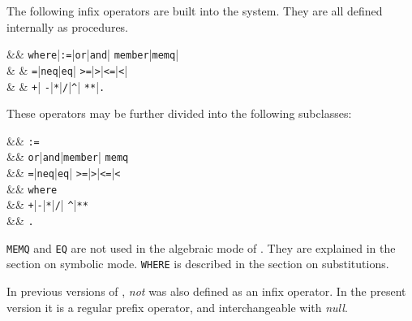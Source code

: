 The following infix operators are built into the
system.  They are all defined internally as procedures.
\begin{syntaxtable}
 &\bnfprod & \texttt{where}|\texttt{:=}|\texttt{or}|\texttt{and}|
                                 \texttt{member}|\texttt{memq}|\\
                        &       & \texttt{=}|\texttt{neq}|\texttt{eq}|
                                 \texttt{>=}|\texttt{>}|\texttt{<=}|\texttt{<}|\\
         &  &         \texttt{+}|
                     \texttt{-}|\texttt{*}|\texttt{/}|\texttt{\textasciicircum}|
                     \texttt{**}|\texttt{.}
\end{syntaxtable}
These operators may be further divided into the following subclasses:
\begin{syntaxtable}
      &\bnfprod & \texttt{:=} \\
         &\bnfprod & \texttt{or}|\texttt{and}|\texttt{member}|
                                           \texttt{memq} \\
      &\bnfprod & \texttt{=}|\texttt{neq}|\texttt{eq}|
                                           \texttt{>=}|\texttt{>}|\texttt{<=}|\texttt{<}\\
    &\bnfprod & \texttt{where} \\
      &\bnfprod & \texttt{+}|\texttt{-}|\texttt{*}|\texttt{/}|
                                           \texttt{\textasciicircum}|\texttt{**} \\
    &\bnfprod & \texttt{.}
\end{syntaxtable}
\texttt{MEMQ} and \texttt{EQ} are not used in the algebraic mode of
{\REDUCE}.  They are explained in the section on symbolic mode.
\texttt{WHERE} is described in the section on substitutions.

In previous versions of {\REDUCE}, \emph{not} was also defined as an infix
operator.  In the present version it is a regular prefix operator, and
interchangeable with \emph{null}.

